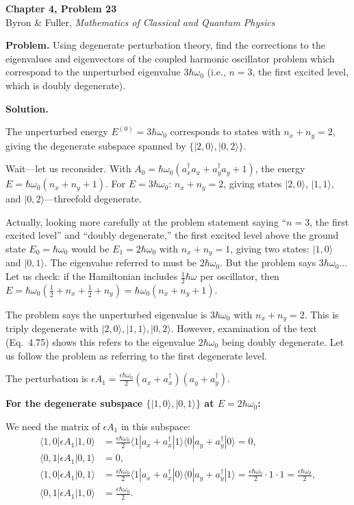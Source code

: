 \documentclass[12pt]{article}
\begin{document}
\begin{center}
{\Large\bfseries Chapter 4, Problem 23}\\[6pt]
Byron \& Fuller, \textit{Mathematics of Classical and Quantum Physics}
\end{center}

\bigskip

\textbf{Problem.} Using degenerate perturbation theory, find the corrections to the eigenvalues and eigenvectors of the coupled harmonic oscillator problem which correspond to the unperturbed eigenvalue $3\hbar\omega_0$ (i.e., $n = 3$, the first excited level, which is doubly degenerate).

\bigskip
\textbf{Solution.}

The unperturbed energy $E^{(0)} = 3\hbar\omega_0$ corresponds to states with $n_x + n_y = 2$, giving the degenerate subspace spanned by $\{|2,0\rangle, |0,2\rangle\}$.

Wait---let us reconsider. With $A_0 = \hbar\omega_0(a_x^\dagger a_x + a_y^\dagger a_y + 1)$, the energy $E = \hbar\omega_0(n_x + n_y + 1)$. For $E = 3\hbar\omega_0$: $n_x + n_y = 2$, giving states $|2,0\rangle$, $|1,1\rangle$, and $|0,2\rangle$---threefold degenerate.

Actually, looking more carefully at the problem statement saying ``$n=3$, the first excited level'' and ``doubly degenerate,'' the first excited level above the ground state $E_0 = \hbar\omega_0$ would be $E_1 = 2\hbar\omega_0$ with $n_x + n_y = 1$, giving two states: $|1,0\rangle$ and $|0,1\rangle$. The eigenvalue referred to must be $2\hbar\omega_0$. But the problem says $3\hbar\omega_0$... Let us check: if the Hamiltonian includes $\frac{1}{2}\hbar\omega$ per oscillator, then $E = \hbar\omega_0(\frac{1}{2}+n_x+\frac{1}{2}+n_y) = \hbar\omega_0(n_x+n_y+1)$.

The problem says the unperturbed eigenvalue is $3\hbar\omega_0$ with $n_x+n_y = 2$. This is triply degenerate with $|2,0\rangle, |1,1\rangle, |0,2\rangle$. However, examination of the text (Eq.\ 4.75) shows this refers to the eigenvalue $2\hbar\omega_0$ being doubly degenerate. Let us follow the problem as referring to the first degenerate level.

The perturbation is $\epsilon A_1 = \frac{\epsilon\hbar\omega_0}{2}(a_x+a_x^\dagger)(a_y+a_y^\dagger)$.

\textbf{For the degenerate subspace $\{|1,0\rangle, |0,1\rangle\}$ at $E = 2\hbar\omega_0$:}

We need the matrix of $\epsilon A_1$ in this subspace:
\begin{align*}
\langle 1,0|\epsilon A_1|1,0\rangle &= \frac{\epsilon\hbar\omega_0}{2}\langle 1|a_x+a_x^\dagger|1\rangle\langle 0|a_y+a_y^\dagger|0\rangle = 0, \\
\langle 0,1|\epsilon A_1|0,1\rangle &= 0, \\
\langle 1,0|\epsilon A_1|0,1\rangle &= \frac{\epsilon\hbar\omega_0}{2}\langle 1|a_x+a_x^\dagger|0\rangle\langle 0|a_y+a_y^\dagger|1\rangle = \frac{\epsilon\hbar\omega_0}{2}\cdot 1 \cdot 1 = \frac{\epsilon\hbar\omega_0}{2}, \\
\langle 0,1|\epsilon A_1|1,0\rangle &= \frac{\epsilon\hbar\omega_0}{2}.
\end{align*}
\end{document}
